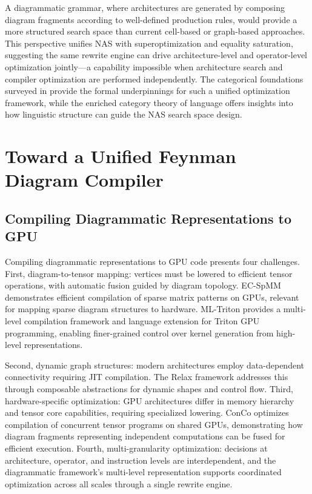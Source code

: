 \documentclass[12pt,a4paper]{article}
\begin{document}
A diagrammatic grammar, where architectures are generated by composing diagram fragments according to well-defined production rules, would provide a more structured search space than current cell-based or graph-based approaches. This perspective unifies NAS with superoptimization and equality saturation, suggesting the same rewrite engine can drive architecture-level and operator-level optimization jointly---a capability impossible when architecture search and compiler optimization are performed independently. The categorical foundations surveyed in \cite{crescenzi2024towards} provide the formal underpinnings for such a unified optimization framework, while the enriched category theory of language \cite{bradley2022an} offers insights into how linguistic structure can guide the NAS search space design.

\section{Toward a Unified Feynman Diagram Compiler}
\subsection{Compiling Diagrammatic Representations to GPU}

Compiling diagrammatic representations to GPU code presents four challenges. First, diagram-to-tensor mapping: vertices must be lowered to efficient tensor operations, with automatic fusion guided by diagram topology. EC-SpMM \cite{lin2023ecspmm} demonstrates efficient compilation of sparse matrix patterns on GPUs, relevant for mapping sparse diagram structures to hardware. ML-Triton \cite{wang2025mltritonam} provides a multi-level compilation framework and language extension for Triton GPU programming, enabling finer-grained control over kernel generation from high-level representations.

Second, dynamic graph structures: modern architectures employ data-dependent connectivity requiring JIT compilation. The Relax framework \cite{lai2023relax} addresses this through composable abstractions for dynamic shapes and control flow. Third, hardware-specific optimization: GPU architectures differ in memory hierarchy and tensor core capabilities, requiring specialized lowering. ConCo \cite{lu2025concooc} optimizes compilation of concurrent tensor programs on shared GPUs, demonstrating how diagram fragments representing independent computations can be fused for efficient execution. Fourth, multi-granularity optimization: decisions at architecture, operator, and instruction levels are interdependent, and the diagrammatic framework's multi-level representation supports coordinated optimization across all scales through a single rewrite engine.
\end{document}
